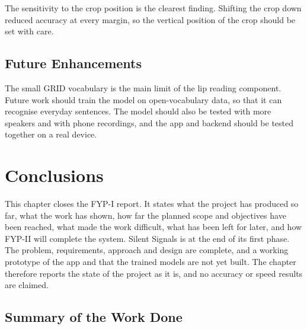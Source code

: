 \documentclass{FastFyp}
\begin{document}
The sensitivity to the crop position is the clearest finding. Shifting the crop down reduced accuracy at every margin, so the vertical position of the crop should be set with care.

\section{Future Enhancements}
The small GRID vocabulary is the main limit of the lip reading component. Future work should train the model on open-vocabulary data, so that it can recognise everyday sentences. The model should also be tested with more speakers and with phone recordings, and the app and backend should be tested together on a real device.



\chapter{Conclusions}
\label{ch:concl}
This chapter closes the FYP-I report. It states what the project has produced so far, what the work has shown, how far the planned scope and objectives have been reached, what made the work difficult, what has been left for later, and how FYP-II will complete the system. Silent Signals is at the end of its first phase. The problem, requirements, approach and design are complete, and a working prototype of the app and that the trained models are not yet built. The chapter therefore reports the state of the project as it is, and no accuracy or speed results are claimed.

\section{Summary of the Work Done}
\end{document}
